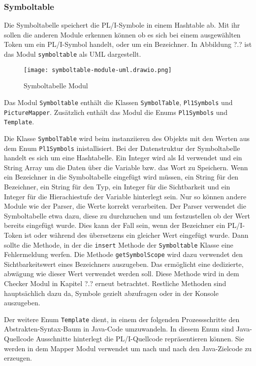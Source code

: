 \subsubsection{Symboltable}
Die Symboltabelle speichert die PL/I-Symbole in einem Hashtable ab. Mit ihr sollen die anderen Module
erkennen können ob es sich bei einem ausgewählten Token um ein PL/I-Symbol handelt, oder um ein Bezeichner.
In Abbildung ?.? ist das Modul \verb+symboltable+ als UML dargestellt.

\begin{figure}[h]
	\centering
	\caption{Symboltabelle Modul}
	\texttt{[image: symboltable-module-uml.drawio.png]}
	\label{fig:symboltable}
\end{figure}

Das Modul \verb+Symboltable+ enthält die Klassen \verb+SymbolTable+, \verb+Pl1Symbols+ und \verb+PictureMapper+.
Zusätzlich enthält das Modul die Enums \verb+Pl1Symbols+ und \verb+Template+.

Die Klasse \verb+SymbolTable+ wird beim instanziieren des Objekts mit den Werten aus dem Enum \verb+Pl1Symbols+ inistallisiert. 
Bei der Datenstruktur der Symboltabelle handelt es sich um eine Hashtabelle. Ein Integer wird als Id verwendet und ein String Array um die Daten über die Variable bzw. das Wort zu Speichern. 
Wenn ein Bezeichner in die Symboltabelle eingefügt wird müssen, ein String für den Bezeichner, ein String für den Typ, ein Integer für die Sichtbarkeit und ein Integer für die Hierachiestufe der Variable hinterlegt sein. Nur so können andere Module wie der Parser, die Werte korrekt verarbeiten.
Der Parser verwendet die Symboltabelle etwa dazu, diese zu durchzuchen und um festzustellen ob der Wert bereits eingefügt wurde.
Dies kann der Fall sein, wenn der Bezeichner ein PL/I-Token ist oder während des übersetzens ein gleicher Wert eingefügt wurde.
Dann sollte die Methode, in der die \verb+insert+ Methode der \verb+Symboltable+ Klasse eine Fehlermeldung werfen.
Die Methode \verb+getSymbolScope+ wird dazu verwendet den Sichtbarkeitswert eines Bezeichners auszugeben. Das ermöglicht eine dedizierte,
abwägung wie dieser Wert verwendet werden soll. Diese Methode wird in dem Checker Modul in Kapitel ?.? erneut betrachtet.
Restliche Methoden sind hauptsächlich dazu da, Symbole gezielt abzufragen oder in der Konsole auszugeben.

Der weitere Enum \verb+Template+ dient, in einem der folgenden Prozessschritte den Abstrakten-Syntax-Baum in Java-Code umzuwandeln.
In diesem Enum sind Java-Quellcode Ausschnitte hinterlegt die PL/I-Quellcode repräsentieren können. Sie werden in dem Mapper Modul verwendet
um nach und nach den Java-Zielcode zu erzeugen.

